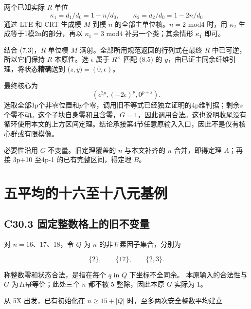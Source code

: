{两个已知实际} {\ensuremath{R}} {单位} \[
\kappa_1=d_1/d_0=1-n/d_0,\qquad
\kappa_2=d_2/d_0=1-2n/d_0
\] {通过} {LTE} {和} {CRT} {生成模} {\ensuremath{M}} {到模} {\ensuremath{n}} {的全部主单位核。\ensuremath{n=2}} {mod4} {时，用} {\ensuremath{\kappa _{2}}} {生成等于1模2n的部分，再以} {\ensuremath{\kappa _{1}=3}} {mod4} {补另一个类；其余情形} {\ensuremath{\kappa _{1}}} {即可。}

{结合} {(7.3)，\ensuremath{R}} {单位模} {\ensuremath{M}} {满射。全部所用规范返回的行列式在最终} {\ensuremath{R}} {中已可逆，所以它们保持} {\ensuremath{R}} {本原性。选} {\ensuremath{\epsilon }} {属于} {\ensuremath{R^\times}} {匹配} {(8.5)} {的} {\ensuremath{y}，由已证主同余纤维引理，将状态}\textbf{{精确}}{送到} {(\ensuremath{z,y)=(0,\epsilon )}。}

{最终核心为} \[
(\epsilon^{2p},(-2\epsilon)^p,0^{p+s}).
\] {选取全部3p个非零位置和\ensuremath{p}个零，调用旧不等式已经独立证明的4p维判据；剩余\ensuremath{s}个零不动。这个子块自身零和且含零，\ensuremath{G=1}，因此调用合法。这也说明收尾没有循环使用本文的上方区间定理。结论承接第4节任意原输入入口，因此不是仅有核心群或有限模像。}

{必要性沿用} {\ensuremath{G}} {不变量。旧定理覆盖的} {\ensuremath{n}} {与本文补齐的} {\ensuremath{n}} {合并，即得定理} {\ensuremath{A}；再接} {3p+10} {至4p-1} {的已有完整区间，得定理} {\ensuremath{B}。}


\section{五平均的十六至十八元基例}\label{construct:five-small}
\subsection*{\texorpdfstring{{C30.3} {固定整数格上的旧不变量}}{C30.3 固定整数格上的旧不变量}}\label{C30-h193}

{对} {\ensuremath{n=16}、17、18，令} {\ensuremath{Q}} {为} {\ensuremath{n}} {的非五素因子集合，分别为}

\[
\{2\},\qquad\{17\},\qquad\{2,3\}.
\]

{称整数零和状态合法，是指在每个} {\ensuremath{q}} {in} {\ensuremath{Q}} {下坐标不全同余。} {本原输入的合法性与} {\ensuremath{G}} {为五幂等价；此处三个} {\ensuremath{n}} {都不被} {5} {整除，因此本原} {\ensuremath{G}} {实际为} {1。}

{从} {5X} {出发，已有初始化在} {\ensuremath{n\ge 15+|Q|}} {时，至多两次安全整数平均建立}


